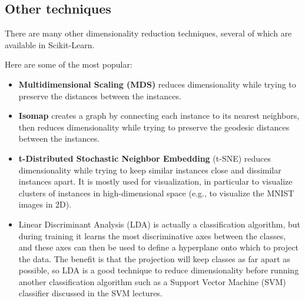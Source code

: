 \documentclass[%
oneside,                 %
final,                   %
10pt]{article}
\begin{document}
\epycod


\subsection{Other techniques}

There are many other dimensionality reduction techniques, several of which are available in Scikit-Learn.

Here are some of the most popular:
\begin{itemize}
\item \textbf{Multidimensional Scaling (MDS)} reduces dimensionality while trying to preserve the distances between the instances.

\item \textbf{Isomap} creates a graph by connecting each instance to its nearest neighbors, then reduces dimensionality while trying to preserve the geodesic distances between the instances.

\item \textbf{t-Distributed Stochastic Neighbor Embedding} (t-SNE) reduces dimensionality while trying to keep similar instances close and dissimilar instances apart. It is mostly used for visualization, in particular to visualize clusters of instances in high-dimensional space (e.g., to visualize the MNIST images in 2D).

\item Linear Discriminant Analysis (LDA) is actually a classification algorithm, but during training it learns the most discriminative axes between the classes, and these axes can then be used to define a hyperplane onto which to project the data. The benefit is that the projection will keep classes as far apart as possible, so LDA is a good technique to reduce dimensionality before running another classification algorithm such as a Support Vector Machine (SVM) classifier discussed in the SVM lectures.
\end{itemize}

\noindent


\end{document}
